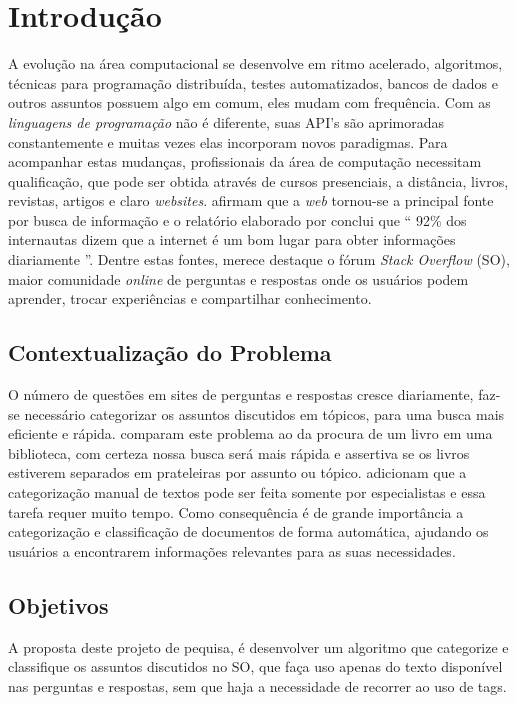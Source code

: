 \documentclass[10pt,a4paper,final]{article}
\begin{document}
    \folhaDeRosto

    \plano
    
    \section{Introdução}
    
A evolução na área computacional se desenvolve em ritmo acelerado, algoritmos, técnicas para programação distribuída, testes automatizados, bancos de dados e outros assuntos possuem algo em comum, eles mudam com frequência. Com as \emph{linguagens de programação} não é diferente, suas API's são aprimoradas constantemente e muitas vezes elas incorporam novos paradigmas. Para acompanhar estas mudanças, profissionais da área de computação necessitam qualificação, que pode ser obtida através de cursos presenciais, a distância, livros, revistas, artigos e claro \textit{websites}.
\newline
\newline
 \cite{Manning2009} afirmam que a \textit{web} tornou-se a principal fonte por busca de informação e o relatório elaborado por \cite{Fallows} conclui que \enquote{ 92\% dos internautas dizem que a internet é um bom lugar para obter informações diariamente }.
Dentre estas fontes, merece destaque o fórum \textit{Stack Overflow} (SO), maior comunidade \textit{online} de perguntas e respostas onde os usuários podem aprender, trocar experiências e compartilhar conhecimento.
    
    \subsection{Contextualização do Problema}
O número de questões em sites de perguntas e respostas cresce diariamente, faz-se necessário categorizar os assuntos discutidos em tópicos, para uma busca mais eficiente e rápida. \cite{Manning2009} comparam este problema ao da procura de um livro em uma biblioteca, com certeza nossa busca será mais rápida e assertiva se os livros estiverem separados em prateleiras por assunto ou tópico. \cite{Yasotha2016} adicionam que a categorização manual de textos pode ser feita somente por especialistas e essa tarefa requer muito tempo. Como consequência é de grande importância a categorização e classificação de documentos de forma automática, ajudando os usuários a encontrarem informações relevantes para as suas necessidades.

    \subsection{Objetivos}
A proposta deste projeto de pequisa, é desenvolver um algoritmo que categorize e classifique os assuntos discutidos no SO, que faça uso apenas do texto disponível nas perguntas e respostas, sem que haja a necessidade de recorrer ao uso de tags.
\end{document}
